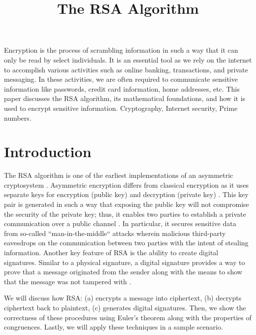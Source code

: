 \documentclass[10pt]{article}
\begin{document}
\noindent



\title{The RSA Algorithm}


\maketitle


\abstract
Encryption is the process of scrambling information in such a way that it can only be read by select individuals. It is an essential tool as we rely on the internet to accomplish various activities such as online banking, transactions, and private messaging. In these activities, we are often required to communicate sensitive information like passwords, credit card information, home addresses, etc. This paper discusses the RSA algorithm, its mathematical foundations, and how it is used to encrypt sensitive information.
\keywords
Cryptography, Internet security, Prime numbers.


\section{Introduction}
The RSA algorithm is one of the earliest implementations of an asymmetric cryptosystem \cite{rivest1978method}. Asymmetric encryption differs from classical encryption as it uses separate keys for encryption (public key) and decryption (private key) \cite{diffie1976new}. This key pair is generated in such a way that exposing the public key will not compromise the security of the private key; thus, it enables two parties to establish a private communication over a public channel \cite{stallings1999cryptography}. In particular, it secures sensitive data from so-called “man-in-the-middle“ attacks wherein malicious third-party eavesdrops on the communication between two parties with the intent of stealing information. Another key feature of RSA is the ability to create digital signatures. Similar to a physical signature, a digital signature provides a way to prove that a message originated from the sender along with the means to show that the message was not tampered with \cite{diffie1976new}. 

We will discuss how RSA: (a) encrypts a message into ciphertext, (b) decrypts ciphertext back to plaintext, (c) generates digital signatures. Then, we show the correctness of these procedures using Euler’s theorem along with the properties of congruences. Lastly, we will apply these techniques in a sample scenario.
\end{document}
